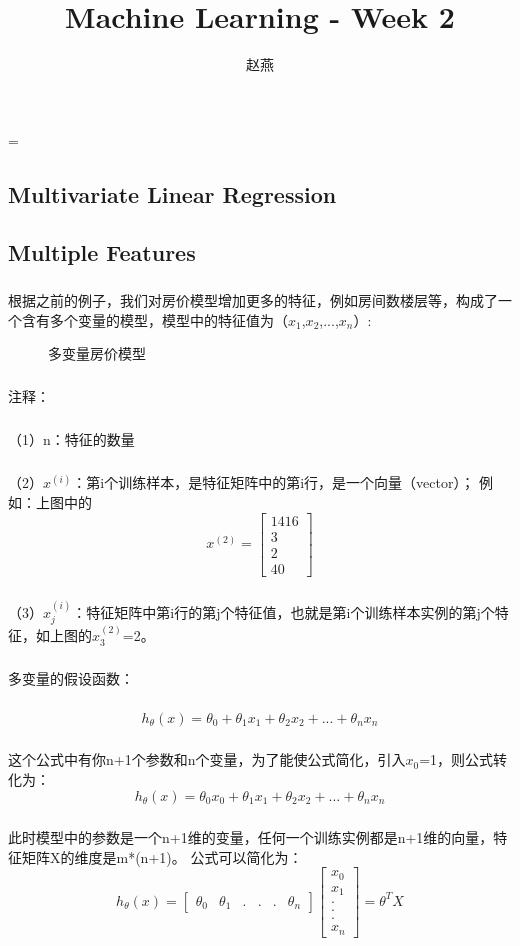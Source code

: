 \documentclass{article}
\title{Machine Learning - Week 2}
\author{赵燕}
\date{}
\begin{document}
 
\hfuzz=\maxdimen
{}
\begin{CJK}{UTF8}{gbsn} 
\maketitle
\renewcommand\contentsname{目录}
\renewcommand\figurename{图}
\tableofcontents
\newpage

\section{Multivariate Linear Regression}
\subsection{Multiple Features}
\subparagraph*{}
 根据之前的例子，我们对房价模型增加更多的特征，例如房间数楼层等，构成了一个含有多个变量的模型，模型中的特征值为（$x_1$,$x_2$,...,$x_n$）:
\begin{figure}[H]
\caption{多变量房价模型}
\label{fig:221}
\end{figure}
\subparagraph*{}
注释：
\subparagraph*{}
（1）n：特征的数量
\subparagraph*{}
（2）$x^{(i)}$：第i个训练样本，是特征矩阵中的第i行，是一个向量（vector）；
例如：上图中的
\begin{equation}
x^{(2)}=\left[\begin{matrix}1416\\3\\2\\40\end{matrix}\right]
\end{equation}
\subparagraph*{}
（3）$x_j^{(i)}$：特征矩阵中第i行的第j个特征值，也就是第i个训练样本实例的第j个特征，如上图的$x_3^{(2)}$=2。
\subparagraph*{}
多变量的假设函数：
\subparagraph*{}
\begin{equation}
h_\theta(x)=\theta_0+\theta_1x_1+\theta_2x_2+...+\theta_nx_n
\end{equation}
\subparagraph*{}
这个公式中有你n+1个参数和n个变量，为了能使公式简化，引入$x_0$=1，则公式转化为：
\begin{equation}
h_\theta(x)=\theta_0x_0+\theta_1x_1+\theta_2x_2+...+\theta_nx_n
\end{equation}
\subparagraph*{}
此时模型中的参数是一个n+1维的变量，任何一个训练实例都是n+1维的向量，特征矩阵X的维度是m*(n+1)。
公式可以简化为：
\begin{equation}
h_\theta(x)=\left[\begin{matrix}\theta_0&\theta_1&.&.&.&\theta_n\end{matrix}\right]\left[\begin{matrix}x_0\\x_1\\.\\.\\.\\x_n\end{matrix}\right]=\theta^TX

\end{equation}
\end{CJK}
\end{document}
